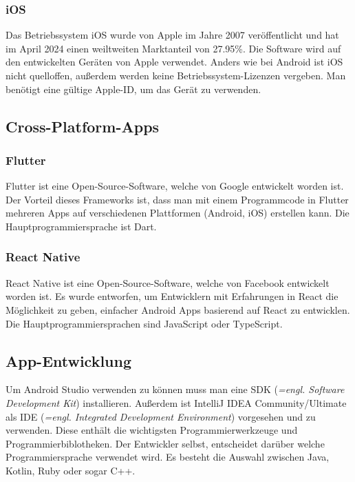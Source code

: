 \subsubsection{iOS}

Das Betriebssystem iOS wurde von Apple im Jahre 2007 veröffentlicht und hat im April 2024 einen weiltweiten Marktanteil von 27.95\%. \parencite{AndroidVsiOS} Die Software wird auf den entwickelten Geräten von Apple verwendet. Anders wie bei Android ist iOS nicht quelloffen, außerdem werden keine Betriebssystem-Lizenzen vergeben. Man benötigt eine gültige Apple-ID, um das Gerät zu verwenden.

\subsection{Cross-Platform-Apps}

\subsubsection{Flutter}

Flutter ist eine Open-Source-Software, welche von Google entwickelt worden ist.\textcite{Flutter} Der Vorteil dieses Frameworks ist, dass man mit einem Programmcode in Flutter mehreren Apps auf verschiedenen Plattformen (Android, iOS) erstellen kann. Die Hauptprogrammiersprache ist Dart.

\subsubsection{React Native}

React Native ist eine Open-Source-Software, welche von Facebook entwickelt worden ist. \textcite{ReactNative} Es wurde entworfen, um Entwicklern mit Erfahrungen in React die Möglichkeit zu geben, einfacher Android Apps basierend auf React zu entwicklen. Die Hauptprogrammiersprachen sind JavaScript oder TypeScript.

\subsection{App-Entwicklung}

Um Android Studio verwenden zu können muss man eine SDK (\textit{=engl. Software Development Kit}) installieren. Außerdem ist IntelliJ IDEA Community/Ultimate als IDE (\textit{=engl. Integrated Development Environment}) vorgesehen und zu verwenden. Diese enthält die wichtigsten Programmierwerkzeuge und Programmierbiblotheken. Der Entwickler selbst, entscheidet darüber welche Programmiersprache verwendet wird. Es besteht die Auswahl zwischen Java, Kotlin, Ruby oder sogar C++.

